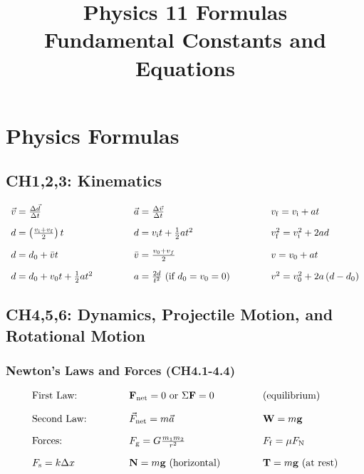 \documentclass[12pt,a4paper]{article}
\title{\textbf{Physics 11 Formulas}\\ Fundamental Constants and Equations}
\date{}
\begin{document}
\maketitle

\section{Physics Formulas}

\subsection{CH1,2,3: Kinematics}
\begin{align*}
\begin{array}{l@{\hspace{1.5cm}}l@{\hspace{1.5cm}}l}
\vec{v}=\frac{\Delta \vec{d}}{\Delta t} & \vec{a}=\frac{\Delta \vec{v}}{\Delta t} & v_{\mathrm{f}}=v_{\mathrm{i}}+a t \\[1em]
d=\left(\frac{v_{\mathrm{i}}+v_{\mathrm{f}}}{2}\right) t & d=v_{\mathrm{i}} t+\frac{1}{2} a t^{2} & v_{\mathrm{f}}^{2}=v_{\mathrm{i}}^{2}+2 a d \\[1em] 
d=d_0+\bar{v} t & \bar{v}=\frac{v_0+v_f}{2}  & v=v_0+a t \\[1em] 
d=d_0+v_0 t+\frac{1}{2} a t^2 & a=\frac{2 d}{t^2} \text{ (if } d_0=v_0=0\text{)} & v^2=v_0^2+2 a\left(d-d_0\right) 
\end{array}
\end{align*}

\subsection{CH4,5,6: Dynamics, Projectile Motion, and Rotational Motion}

\subsubsection{Newton's Laws and Forces (CH4.1-4.4)}
\begin{align*}
\begin{array}{l@{\hspace{1.5cm}}l@{\hspace{1.5cm}}l}
\text{First Law:} & \mathbf{F}_{\text{net}}=0 \text{ or } \Sigma \mathbf{F}=0 & \text{(equilibrium)} \\[1em]
\text{Second Law:} & \vec{F}_{\text{net}}=m\vec{a} & \mathbf{W}=m\mathbf{g} \\[1em]
\text{Forces:} & F_{\mathrm{g}}=G \frac{m_{1} m_{2}}{r^{2}} & F_{\mathrm{f}}=\mu F_{\mathrm{N}} \\[1em]
F_{\mathrm{s}}=k \Delta x & \mathbf{N}=m\mathbf{g} \text{ (horizontal)} & \mathbf{T}=m\mathbf{g} \text{ (at rest)}
\end{array}
\end{align*}
\end{document}
